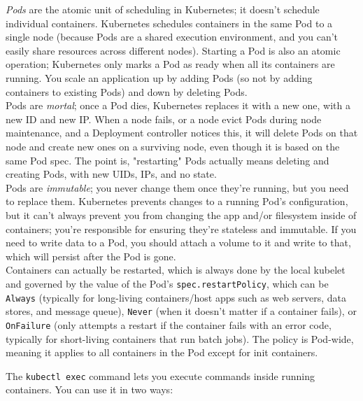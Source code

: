 \documentclass[table, xcdraw]{article}%
\begin{document}
\emph{Pods} are the atomic unit of scheduling in Kubernetes; it doesn't schedule individual containers. Kubernetes schedules containers in the same Pod to a single node (because Pods are a shared execution environment, and you can’t easily share resources across different nodes). Starting a Pod is also an atomic operation; Kubernetes only marks a Pod as ready when all its containers are running. You scale an application up by adding Pods (so not by adding containers to existing Pods) and down by deleting Pods.\\
Pods are \emph{mortal}; once a Pod dies, Kubernetes replaces it with a new one, with a new ID and new IP. When a node fails, or a node evict Pods during node maintenance, and a Deployment controller notices this, it will delete Pods on that node and create new ones on a surviving node, even though it is based on the same Pod spec. The point is, "restarting" Pods actually means deleting and creating Pods, with new UIDs, IPs, and no state.\\
Pods are \emph{immutable}; you never change them once they’re running, but you need to replace them. Kubernetes prevents changes to a running Pod’s configuration, but it can’t always prevent you from changing the app and/or filesystem inside of containers; you’re responsible for ensuring they're stateless and immutable. If you need to write data to a Pod, you should attach a volume to it and write to that, which will persist after the Pod is gone.\\
Containers can actually be restarted, which is always done by the local kubelet and governed by the value of the Pod’s \texttt{spec.restartPolicy}, which can be \texttt{Always} (typically for long-living containers/host apps such as web servers, data stores, and message queue), \texttt{Never} (when it doesn't matter if a container fails), or \texttt{OnFailure} (only attempts a restart if the container fails with an error code, typically for short-living containers that run batch jobs). The policy is Pod-wide, meaning it applies to all containers in the Pod except for init containers.

The \texttt{kubectl exec} command lets you execute commands inside running containers. You can use it in two ways:
\end{document}
